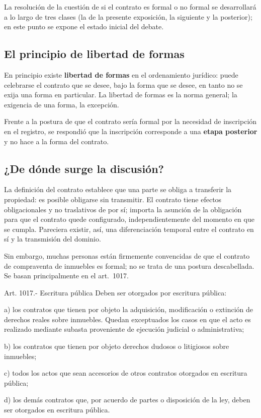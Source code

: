 \documentclass[12pt,oneside]{book}
\begin{document}
La resolución de la cuestión de si el contrato es formal o no formal se desarrollará a lo largo de tres clases (la de la presente exposición, la siguiente y la posterior); en este punto se expone el estado inicial del debate.

\subsection{El principio de libertad de formas}

En principio existe \textbf{libertad de formas} en el ordenamiento jurídico: puede celebrarse el contrato que se desee, bajo la forma que se desee, en tanto no se exija una forma en particular. La libertad de formas es la norma general; la exigencia de una forma, la excepción.

Frente a la postura de que el contrato sería formal por la necesidad de inscripción en el registro, se respondió que la inscripción corresponde a una \textbf{etapa posterior} y no hace a la forma del contrato.

\subsection{¿De dónde surge la discusión?}

La definición del contrato establece que una parte se obliga a transferir la propiedad: es posible obligarse sin transmitir. El contrato tiene efectos obligacionales y no traslativos de por sí; importa la asunción de la obligación para que el contrato quede configurado, independientemente del momento en que se cumpla. Pareciera existir, así, una diferenciación temporal entre el contrato en sí y la transmisión del dominio.

Sin embargo, muchas personas están firmemente convencidas de que el contrato de compraventa de inmuebles es formal; no se trata de una postura descabellada. Se basan principalmente en el art.~1017.

\begin{norma}{Art. 1017.- Escritura pública}
Deben ser otorgados por escritura pública:

a) los contratos que tienen por objeto la adquisición, modificación o extinción de derechos reales sobre inmuebles. Quedan exceptuados los casos en que el acto es realizado mediante subasta proveniente de ejecución judicial o administrativa;

b) los contratos que tienen por objeto derechos dudosos o litigiosos sobre inmuebles;

c) todos los actos que sean accesorios de otros contratos otorgados en escritura pública;

d) los demás contratos que, por acuerdo de partes o disposición de la ley, deben ser otorgados en escritura pública.
\end{norma}
\end{document}
